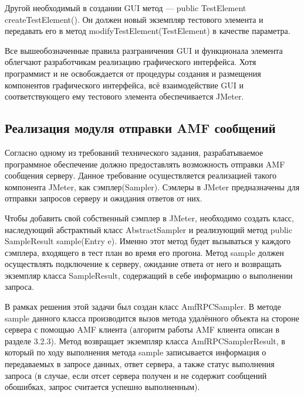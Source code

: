 Другой необходимый в создании GUI метод --- public TestElement createTestElement(). Он должен новый экземпляр
тестового элемента и передавать его в метод modifyTestElement(TestElement) в качестве параметра.

Все вышеобозначенные правила разграничения GUI и функционала элемента облегчают разработчикам реализацию графического
интерфейса. Хотя программист и не освобождается от процедуры создания и размещения компонентов графического
интерфейса, всё взаимодействие GUI и соответствующего ему тестового элемента обеспечивается JMeter.

\subsection{Реализация модуля отправки AMF сообщений}

Согласно одному из требований технического задания, разрабатываемое программное обеспечение должно предоставлять возможность 
отправки AMF сообщения серверу. Данное требование осуществляется реализацией такого компонента JMeter, как сэмплер(Sampler). 
Сэмлеры в JMeter предназначены для отправки запросов серверу и ожидания ответов от них. 

Чтобы добавить свой собственный сэмплер в JMeter, необходимо создать класс, наследующий абстрактный класс AbstractSampler и 
реализующий метод public SampleResult sample(Entry e). Именно этот метод будет вызываться у каждого сэмплера, входящего в 
тест план во время его прогона. Метод sample должен осуществлять подключение к серверу, ожидание ответа от него и возвращать 
экземпляр класса SampleResult, содержащий в себе информацию о выполнении запроса.

В рамках решения этой задачи был создан класс AmfRPCSampler. В методе sample данного класса производится вызов метода 
удалённого объекта на стороне сервера с помощью AMF клиента (алгоритм работы AMF клиента описан в разделе 3.2.3). 
Метод возвращает экземпляр класса AmfRPCSamplerResult, в который по ходу выполнения метода sample записывается информация 
о передаваемых в запросе данных, ответ сервера, а также статус выполнения запроса (в случае, если отсет сервера получен и 
не содержит сообщений обошибках, запрос считается успешно выполненным).

